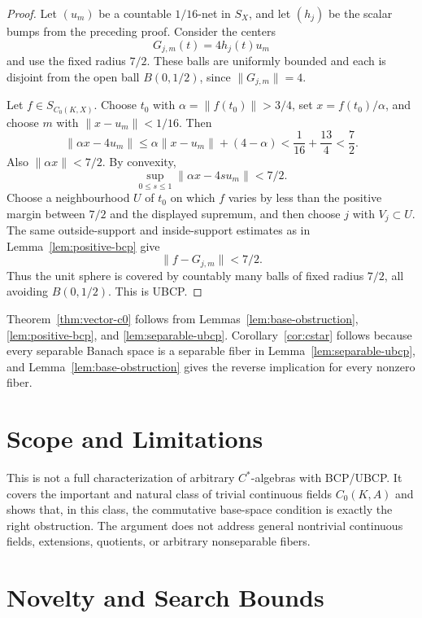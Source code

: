 \documentclass[11pt]{article}
\begin{document}
\begin{proof}
Let \((u_m)\) be a countable \(1/16\)-net in \(S_X\), and let \((h_j)\) be the
scalar bumps from the preceding proof.  Consider the centers
\[
        G_{j,m}(t)=4h_j(t)u_m
\]
and use the fixed radius \(7/2\).  These balls are uniformly bounded and each
is disjoint from the open ball \(B(0,1/2)\), since \(\|G_{j,m}\|=4\).

Let \(f\in S_{C_0(K,X)}\).  Choose \(t_0\) with
\(\alpha=\|f(t_0)\|>3/4\), set \(x=f(t_0)/\alpha\), and choose \(m\) with
\(\|x-u_m\|<1/16\).  Then
\[
        \|\alpha x-4u_m\|
        \le \alpha\|x-u_m\|+(4-\alpha)
        < \frac1{16}+\frac{13}{4}<\frac72 .
\]
Also \(\|\alpha x\|<7/2\).  By convexity,
\[
        \sup_{0\le s\le1}\|\alpha x-4s u_m\|<7/2.
\]
Choose a neighbourhood \(U\) of \(t_0\) on which \(f\) varies by less than the
positive margin between \(7/2\) and the displayed supremum, and then choose
\(j\) with \(V_j\subset U\).  The same outside-support and inside-support
estimates as in Lemma~\ref{lem:positive-bcp} give
\[
        \|f-G_{j,m}\|<7/2 .
\]
Thus the unit sphere is covered by countably many balls of fixed radius
\(7/2\), all avoiding \(B(0,1/2)\).  This is UBCP.
\end{proof}

Theorem~\ref{thm:vector-c0} follows from Lemmas~\ref{lem:base-obstruction},
\ref{lem:positive-bcp}, and \ref{lem:separable-ubcp}.  Corollary~\ref{cor:cstar}
follows because every separable Banach space is a separable fiber in
Lemma~\ref{lem:separable-ubcp}, and Lemma~\ref{lem:base-obstruction} gives the
reverse implication for every nonzero fiber.

\section*{Scope and Limitations}

This is not a full characterization of arbitrary \(C^*\)-algebras with
BCP/UBCP.  It covers the important and natural class of trivial continuous
fields \(C_0(K,A)\) and shows that, in this class, the commutative base-space
condition is exactly the right obstruction.  The argument does not address
general nontrivial continuous fields, extensions, quotients, or arbitrary
nonseparable fibers.

\section*{Novelty and Search Bounds}
\end{document}
